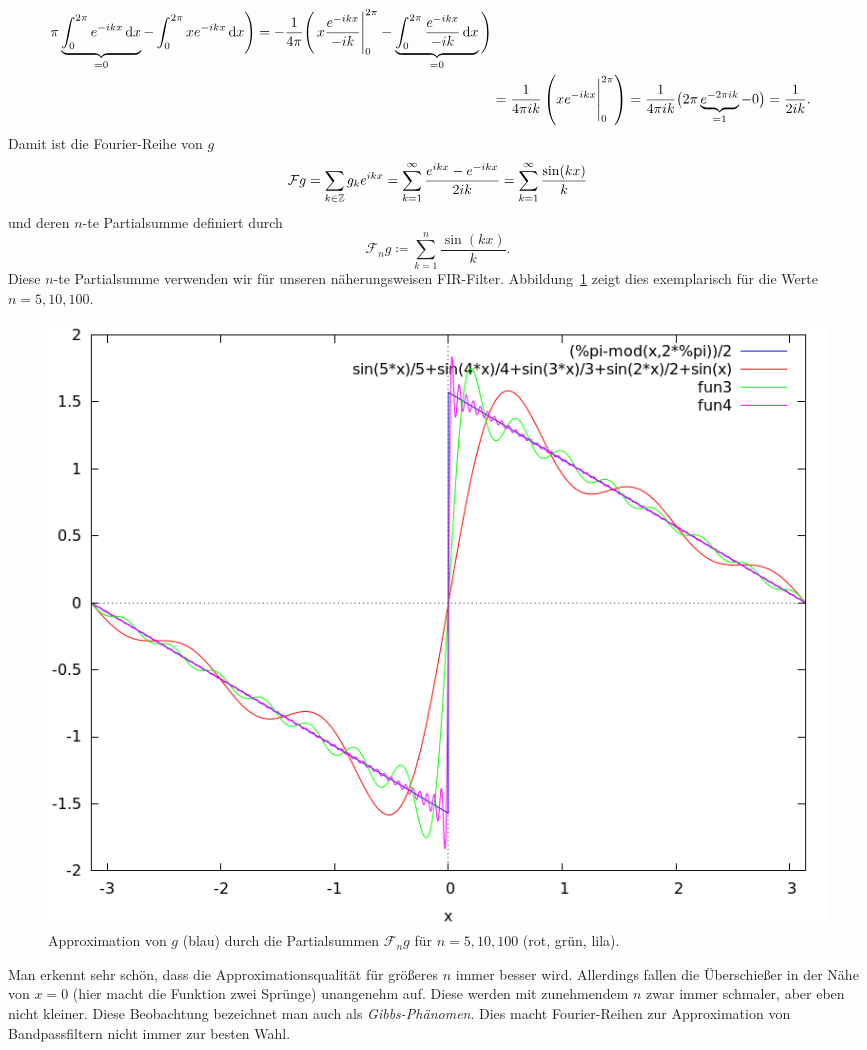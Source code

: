 \begin{example}
\begin{align*}
      \pi \underbrace{ \int_{0}^{2\pi} e^{-ikx} \dif x }_{=0} - \int_{0}^{2\pi} xe^{-ikx} \dif x
    \Bigg)
 = -\frac{1}{4\pi} \Bigg( 
      \eval{ x\frac{e^{-ikx}}{-ik} }_{0}^{2\pi} - 
        \underbrace{ \int_{0}^{2\pi} \frac{e^{-ikx}}{-ik} \dif x }_{= 0}
    \Bigg) \\
&= \frac{1}{4\pi ik} \left( \eval{ xe^{-ikx} }_{0}^{2\pi} \right) 
 = \frac{1}{4\pi ik} \big( 2\pi \underbrace{ e^{-2\pi ik} }_{= 1} - 0 \big)
 = \frac{1}{2ik}.
\end{align*}
Damit ist die Fourier-Reihe von $ g $
\[
    \mathcal{F}g
  = \sum_{k \in \mathbb{Z}} g_{k} e^{ikx}
  = \sum_{k = 1}^{\infty} \frac{e^{ikx} - e^{-ikx}}{2ik}
  = \sum_{k = 1}^{\infty} \frac{\sin(kx)}{k}
\]
und deren $ n $-te Partialsumme definiert durch
\[
  \mathcal{F}_{n}g \coloneqq \sum_{k = 1}^{n} \frac{\sin(kx)}{k}.
\]
Diese $ n $-te Partialsumme verwenden wir für unseren näherungsweisen FIR-Filter. 
Abbildung~\ref{fig:sawtooth_fourier} zeigt dies exemplarisch für die Werte $ n = 5, 10, 100 $.
\begin{figure}[ht]
\centering
\includegraphics[width=0.5\linewidth]{Bilder/sawtooth_fourier}
\caption{Approximation von $ g $ (blau) durch die Partialsummen $ \mathcal{F}_{n}g $ für $ n = 5, 
10, 100 $ (rot, grün, lila).}
\label{fig:sawtooth_fourier}
\end{figure}
Man erkennt sehr schön, dass die Approximationsqualität für größeres $ n $ immer besser wird.
Allerdings fallen die Überschießer in der Nähe von $ x = 0 $ (hier macht die Funktion zwei Sprünge) 
unangenehm auf. Diese werden mit zunehmendem $ n $ zwar immer schmaler, aber eben nicht kleiner.
Diese Beobachtung bezeichnet man auch als \emph{Gibbs-Phänomen}. Dies macht Fourier-Reihen zur 
Approximation von Bandpassfiltern nicht immer zur besten Wahl.


\end{example}

